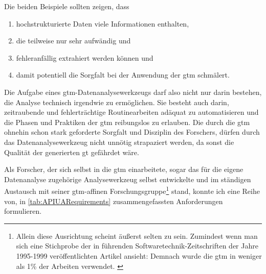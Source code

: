 Die beiden Beispiele sollten zeigen, dass \begin{enumerate}
\itemsep1pt\parskip0pt
  \item hochstrukturierte Daten viele Informationen enthalten,
  \item die teilweise nur sehr aufwändig und
  \item fehleranfällig extrahiert werden können und
  \item damit potentiell die Sorgfalt bei der Anwendung der \gls{gtm} schmälert.
\end{enumerate}

Die Aufgabe eines \gls{gtm}-Datenanalysewerkzeugs darf also nicht nur darin bestehen, die Analyse technisch irgendwie zu ermöglichen. Sie besteht auch darin, zeitraubende und fehlerträchtige Routinearbeiten adäquat zu automatisieren und die Phasen und Praktiken der \gls{gtm} reibungslos zu erlauben. Die durch die \gls{gtm} ohnehin schon stark geforderte Sorgfalt und Disziplin des Forschers, dürfen durch das Datenanalysewerkzeug nicht unnötig strapaziert werden, da sonst die Qualität der generierten \gls{gt} gefährdet wäre.

Als Forscher, der sich selbst in die \gls{gtm} einarbeitete, sogar das für die eigene Datenanalyse zugehörige Analysewerkzeug selbst entwickelte und im ständigen Austausch mit seiner \gls{gtm}-affinen Forschungsgruppe\footnote{Allein diese Ausrichtung scheint äußerst selten zu sein. Zumindest wenn man sich eine Stichprobe der in führenden Softwaretechnik-Zeitschriften der Jahre 1995-1999 veröffentlichten Artikel ansieht: Demnach wurde die \gls{gtm} in weniger als 1\% der Arbeiten verwendet. \citep{Glass:2002ec}} stand, konnte ich eine Reihe von, in \autoref{tab:APIUARequirements} zusammengefassten Anforderungen formulieren.

